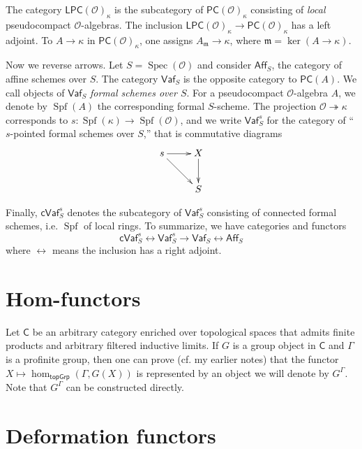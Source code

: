 \documentclass{article}
\DeclareMathOperator{\spf}{Spf}
\DeclareMathOperator{\spec}{Spec}
\newcommand{\cO}{\mathcal{O}}
\newcommand{\fm}{\mathfrak{m}}
\numberwithin{theorem}{section}
\begin{document}
The category $\mathsf{LPC}(\cO)_\kappa$ is the subcategory of 
$\mathsf{PC}(\cO)_\kappa$ consisting of \emph{local} pseudocompact 
$\cO$-algebras. The inclusion 
$\mathsf{LPC}(\cO)_\kappa\to\mathsf{PC}(\cO)_\kappa$ has a left adjoint. To 
$A\to\kappa$ in $\mathsf{PC}(\cO)_\kappa$, one assigns $A_\fm\to\kappa$, where 
$\fm=\ker(A\to\kappa)$. 

Now we reverse arrows. Let $S=\spec(\cO)$ and consider $\mathsf{Aff}_S$, the 
category of affine schemes over $S$. The category $\mathsf{Vaf}_S$ is the 
opposite category to $\mathsf{PC}(A)$. We call objects of $\mathsf{Vaf}_S$ 
\emph{formal schemes over $S$}. For a pseudocompact $\cO$-algebra $A$, we 
denote by $\spf(A)$ the corresponding formal $S$-scheme. The projection 
$\cO\twoheadrightarrow\kappa$ corresponds to $s:\spf(\kappa)\to\spf(\cO)$, and 
we write $\mathsf{Vaf}_S^s$ for the category of ``$s$-pointed formal schemes 
over $S$,'' that is commutative diagrams 
\[\xymatrix{
  s \ar[r] \ar[dr] & X \ar[d] \\
  & S
}\]

Finally, $\mathsf{cVaf}_S^s$ denotes the subcategory of $\mathsf{Vaf}_S^s$ 
consisting of connected formal schemes, i.e. $\spf$ of local rings. To 
summarize, we have categories and functors 
\[
  \mathsf{cVaf}_S^s \leftrightarrow \mathsf{Vaf}_S^s \to \mathsf{Vaf}_S\leftrightarrow \mathsf{Aff}_S
\]
where $\leftrightarrow$ means the inclusion has a right adjoint. 





\section{Hom-functors}

Let $\mathsf{C}$ be an arbitrary category enriched over topological spaces 
that admits finite products and arbitrary filtered inductive limits. If $G$ is 
a group object in $\mathsf{C}$ and $\Gamma$ is a profinite group, then one can 
prove (cf. my earlier notes) that the functor 
$X\mapsto \hom_{\mathsf{topGrp}}(\Gamma,G(X))$ is represented by an object we 
will denote by $G^\Gamma$. Note that $G^\Gamma$ can be constructed directly. 





\section{Deformation functors}
\end{document}
